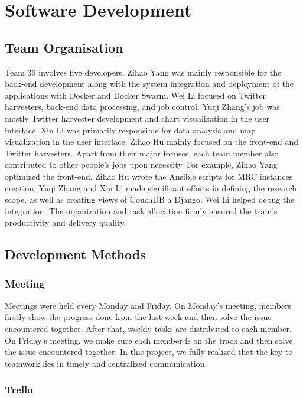 \section{Software Development}

\subsection{Team Organisation}

Team 39 involves five developers. Zihao Yang was mainly responsible for the back-end development along with the system integration and deployment of the applications with Docker and Docker Swarm. Wei Li focused on Twitter harvesters, back-end data processing, and job control. Yuqi Zhang’s job was mostly Twitter harvester development and chart visualization in the user interface. Xin Li was primarily responsible for data analysis and map visualization in the user interface. Zihao Hu mainly focused on the front-end and Twitter harvesters. Apart from their major focuses, each team member also contributed to other people’s jobs upon necessity. For example, Zihao Yang optimized the front-end. Zihao Hu wrote the Ansible scripts for MRC instances creation. Yuqi Zhang and Xin Li made significant efforts in defining the research scope, as well as creating views of CouchDB a Django. Wei Li helped debug the integration. The organization and task allocation firmly ensured the team's productivity and delivery quality. 

\subsection{Development Methods}

\subsubsection{Meeting}

Meetings were held every Monday and Friday. On Monday’s meeting, members firstly show the progress done from the last week and then solve the issue encountered together. After that, weekly tasks are distributed to each member. On Friday’s meeting, we make sure each member is on the track and then solve the issue encountered together. In this project, we fully realized that the key to teamwork lies in timely and centralized communication.

\subsubsection{Trello}

